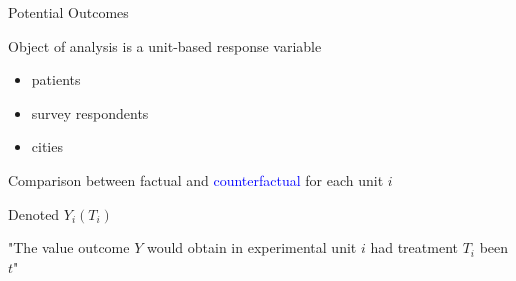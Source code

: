 \documentclass[notes,11pt, aspectratio=169, usenames, dvipsnames]{beamer}
\newenvironment{wideitemize}{\itemize\addtolength{\itemsep}{10pt}}{\enditemize}
\begin{document}
\begin{frame}{Potential Outcomes}
	\begin{wideitemize}
		\item<1-> Object of analysis is a unit-based response variable
		\begin{itemize}
			\item patients
			\item survey respondents
			\item cities
		\end{itemize}
		\item<2-> Comparison between factual and \textcolor{blue}{counterfactual} for each unit $i$
		\item<3-> Denoted $Y_i(T_i)$
		\item<4-> "The value outcome $Y$ would obtain in experimental unit $i$ had treatment $T_i$ been $t$" 
	\end{wideitemize}
\end{frame}
	
\end{document}
